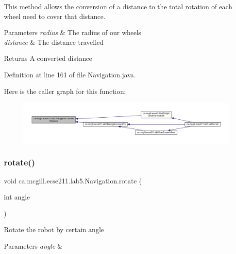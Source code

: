 This method allows the conversion of a distance to the total rotation of each wheel need to cover that distance.


\begin{DoxyParams}{Parameters}
{\em radius} & The radius of our wheels \\
\hline
{\em distance} & The distance travelled \\
\hline
\end{DoxyParams}
\begin{DoxyReturn}{Returns}
A converted distance 
\end{DoxyReturn}


Definition at line 161 of file Navigation.\+java.

Here is the caller graph for this function\+:
\nopagebreak
\begin{figure}[H]
\begin{center}
\leavevmode
\includegraphics[width=350pt]{classca_1_1mcgill_1_1ecse211_1_1lab5_1_1_navigation_a85122ad723d0988c118866f367073be6_icgraph}
\end{center}
\end{figure}
\mbox{\label{classca_1_1mcgill_1_1ecse211_1_1lab5_1_1_navigation_a5fcce0063a6b557d349a6fb5bf144c64}} 
\subsubsection{\texorpdfstring{rotate()}{rotate()}}
{\footnotesize\ttfamily void ca.\+mcgill.\+ecse211.\+lab5.\+Navigation.\+rotate (\begin{DoxyParamCaption}\item[{int}]{angle }\end{DoxyParamCaption})}

Rotate the robot by certain angle 
\begin{DoxyParams}{Parameters}
{\em angle} & \\
\hline
\end{DoxyParams}


